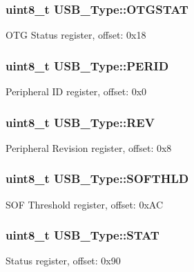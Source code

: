 \subsubsection[{\texorpdfstring{O\+T\+G\+S\+T\+AT}{OTGSTAT}}]{ uint8\+\_\+t U\+S\+B\+\_\+\+Type\+::\+O\+T\+G\+S\+T\+AT}\hypertarget{structUSB__Type_adb73c0ed8ec05b05499d164fee6a6d9c}{}\label{structUSB__Type_adb73c0ed8ec05b05499d164fee6a6d9c}
O\+TG Status register, offset\+: 0x18 
\subsubsection[{\texorpdfstring{P\+E\+R\+ID}{PERID}}]{ uint8\+\_\+t U\+S\+B\+\_\+\+Type\+::\+P\+E\+R\+ID}\hypertarget{structUSB__Type_a2e5e3896393e567c46fbcfe1ea92bade}{}\label{structUSB__Type_a2e5e3896393e567c46fbcfe1ea92bade}
Peripheral ID register, offset\+: 0x0 
\subsubsection[{\texorpdfstring{R\+EV}{REV}}]{ uint8\+\_\+t U\+S\+B\+\_\+\+Type\+::\+R\+EV}\hypertarget{structUSB__Type_aebfcc05a57aa51e7cdeb38d058ccd5f1}{}\label{structUSB__Type_aebfcc05a57aa51e7cdeb38d058ccd5f1}
Peripheral Revision register, offset\+: 0x8 
\subsubsection[{\texorpdfstring{S\+O\+F\+T\+H\+LD}{SOFTHLD}}]{ uint8\+\_\+t U\+S\+B\+\_\+\+Type\+::\+S\+O\+F\+T\+H\+LD}\hypertarget{structUSB__Type_a5567027779ec927376c0d8a60d53fb24}{}\label{structUSB__Type_a5567027779ec927376c0d8a60d53fb24}
S\+OF Threshold register, offset\+: 0x\+AC 
\subsubsection[{\texorpdfstring{S\+T\+AT}{STAT}}]{ uint8\+\_\+t U\+S\+B\+\_\+\+Type\+::\+S\+T\+AT}\hypertarget{structUSB__Type_a54025377f3daec606230cd235bd81916}{}\label{structUSB__Type_a54025377f3daec606230cd235bd81916}
Status register, offset\+: 0x90 
